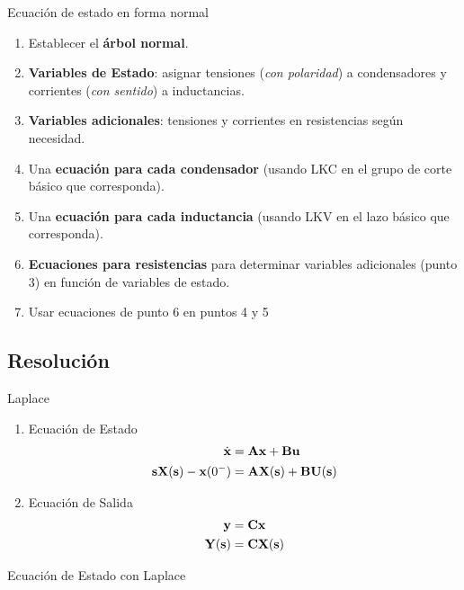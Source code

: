 {Ecuación de estado en forma normal}

\begin{enumerate}
\item Establecer el \textbf{árbol normal}.
\item \textbf{Variables de Estado}: asignar tensiones (\emph{con polaridad}) a condensadores y corrientes (\emph{con sentido}) a inductancias.
\item \textbf{Variables adicionales}: tensiones y corrientes en resistencias según necesidad.
\item Una \textbf{ecuación para cada condensador} (usando LKC en el grupo de corte básico que corresponda).
\item Una \textbf{ecuación para cada inductancia} (usando LKV en el lazo básico que corresponda).
\item \textbf{Ecuaciones para resistencias} para determinar variables adicionales (punto 3) en función de variables de estado.

\item Usar ecuaciones de punto 6 en puntos 4 y 5
\end{enumerate}

\subsection{Resolución}

{Laplace}

\begin{enumerate}
\item Ecuación de Estado
\label{sec:orgcf8aaa4}
\begin{align*}
  \dot{\mathbf{x}} &= \mathbf{A}\mathbf{x} + \mathbf{B}\mathbf{u}\\
  \mathbf{s} \mathbf{X}(\mathbf{s}) - \mathbf{x}(0^-) &= \mathbf{A}\mathbf{X}(\mathbf{s}) + \mathbf{B}\mathbf{U}(\mathbf{s})\\
\end{align*}
\item Ecuación de Salida
\label{sec:org73fb6be}
\begin{align*}
  \mathbf{y} &= \mathbf{C}\mathbf{x}\\
  \mathbf{Y}(\mathbf{s}) &= \mathbf{C}\mathbf{X}(\mathbf{s})
\end{align*}
\end{enumerate}

{Ecuación de Estado con Laplace}

